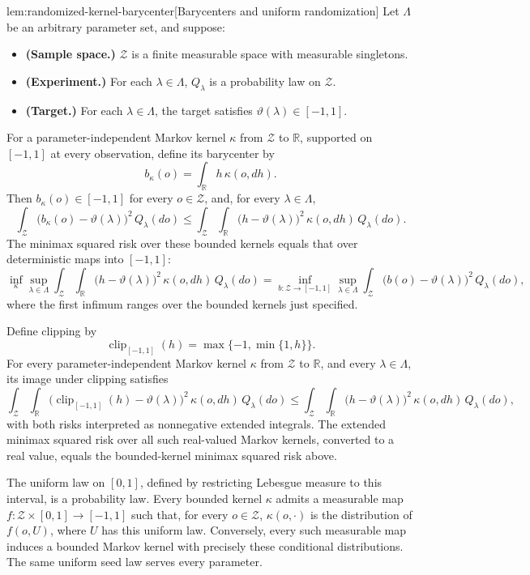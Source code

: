 \documentclass[11pt]{article}
\begin{document}
\begin{lemmav}{lem:randomized-kernel-barycenter}[Barycenters and uniform randomization]
Let \(\Lambda\) be an arbitrary parameter set, and suppose:
\begin{itemize}
\item \textbf{(Sample space.)} \(\mathcal Z\) is a finite measurable space with measurable singletons.
\item \textbf{(Experiment.)} For each \(\lambda\in\Lambda\), \(Q_\lambda\) is a probability law on \(\mathcal Z\).
\item \textbf{(Target.)} For each \(\lambda\in\Lambda\), the target satisfies \(\vartheta(\lambda)\in[-1,1]\).
\end{itemize}
For a parameter-independent Markov kernel \(\kappa\) from \(\mathcal Z\) to \(\mathbb R\), supported on \([-1,1]\) at every observation, define its barycenter by
\[
b_\kappa(o)=\int_{\mathbb R}h\,\kappa(o,dh).
\]
Then \(b_\kappa(o)\in[-1,1]\) for every \(o\in\mathcal Z\), and, for every \(\lambda\in\Lambda\),
\[
\int_{\mathcal Z}\bigl(b_\kappa(o)-\vartheta(\lambda)\bigr)^2\,Q_\lambda(do)
\le
\int_{\mathcal Z}\int_{\mathbb R}
\bigl(h-\vartheta(\lambda)\bigr)^2\,\kappa(o,dh)\,Q_\lambda(do).
\]
The minimax squared risk over these bounded kernels equals that over deterministic maps into \([-1,1]\):
\[
\inf_{\kappa}\sup_{\lambda\in\Lambda}
\int_{\mathcal Z}\int_{\mathbb R}
\bigl(h-\vartheta(\lambda)\bigr)^2\,\kappa(o,dh)\,Q_\lambda(do)
=
\inf_{b:\mathcal Z\to[-1,1]}\sup_{\lambda\in\Lambda}
\int_{\mathcal Z}\bigl(b(o)-\vartheta(\lambda)\bigr)^2\,Q_\lambda(do),
\]
where the first infimum ranges over the bounded kernels just specified.

Define clipping by
\[
\operatorname{clip}_{[-1,1]}(h)=\max\{-1,\min\{1,h\}\}.
\]
For every parameter-independent Markov kernel \(\kappa\) from \(\mathcal Z\) to \(\mathbb R\), and every \(\lambda\in\Lambda\), its image under clipping satisfies
\[
\int_{\mathcal Z}\int_{\mathbb R}
\bigl(\operatorname{clip}_{[-1,1]}(h)-\vartheta(\lambda)\bigr)^2
\,\kappa(o,dh)\,Q_\lambda(do)
\le
\int_{\mathcal Z}\int_{\mathbb R}
\bigl(h-\vartheta(\lambda)\bigr)^2\,\kappa(o,dh)\,Q_\lambda(do),
\]
with both risks interpreted as nonnegative extended integrals. The extended minimax squared risk over all such real-valued Markov kernels, converted to a real value, equals the bounded-kernel minimax squared risk above.

The uniform law on \([0,1]\), defined by restricting Lebesgue measure to this interval, is a probability law. Every bounded kernel \(\kappa\) admits a measurable map
\(f:\mathcal Z\times[0,1]\to[-1,1]\) such that, for every \(o\in\mathcal Z\), \(\kappa(o,\cdot)\) is the distribution of \(f(o,U)\), where \(U\) has this uniform law. Conversely, every such measurable map induces a bounded Markov kernel with precisely these conditional distributions. The same uniform seed law serves every parameter.
\end{lemmav}
\end{document}
